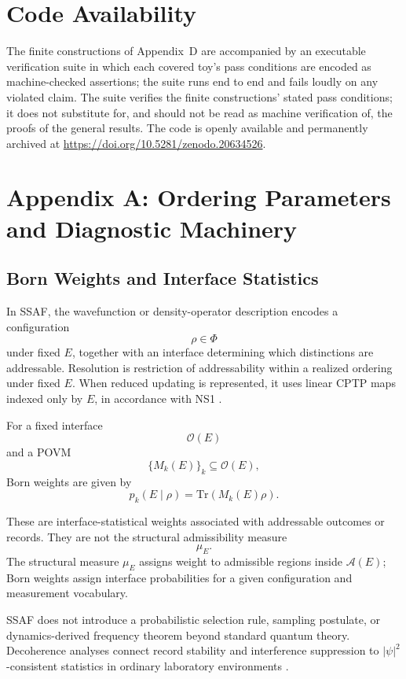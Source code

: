 \documentclass[aps,prx,onecolumn,11pt]{revtex4-2}
\theoremstyle{plain}
\theoremstyle{definition}
\theoremstyle{remark}
\begin{document}
\section*{Code Availability}

The finite constructions of Appendix~D are accompanied by an
executable verification suite in which each covered toy's pass
conditions are encoded as machine-checked assertions; the suite runs
end to end and fails loudly on any violated claim. The suite verifies
the finite constructions' stated pass conditions; it does not
substitute for, and should not be read as machine verification of, the
proofs of the general results. The code is openly
available and permanently archived at
\url{https://doi.org/10.5281/zenodo.20634526}.

\section{Appendix A: Ordering Parameters and Diagnostic Machinery}
\label{app:diagnostic_machinery}

\subsection{Born Weights and Interface Statistics}
\label{appA:admissibility_born}

In SSAF, the wavefunction or density-operator description encodes a
configuration
\[
\rho\in\Phi
\]
under fixed \(E\), together with an interface determining which
distinctions are addressable. Resolution is restriction of
addressability within a realized ordering under fixed \(E\). When
reduced updating is represented, it uses linear CPTP maps indexed only
by \(E\), in accordance with NS1
\cite{Kraus1983,Lindblad1976,Gorini1976,Watrous2018,Gisin1989,
Gisin1990,Polchinski1991}.

For a fixed interface
\[
\mathcal O(E)
\]
and a POVM
\[
\{M_k(E)\}_k\subseteq\mathcal O(E),
\]
Born weights are given by
\[
p_k(E\mid\rho)
=
\mathrm{Tr}(M_k(E)\rho).
\]

These are interface-statistical weights associated with addressable
outcomes or records. They are not the structural admissibility measure
\[
\mu_E.
\]
The structural measure \(\mu_E\) assigns weight to admissible regions
inside \(\mathcal A(E)\); Born weights assign interface probabilities
for a given configuration and measurement vocabulary.

SSAF does not introduce a probabilistic selection rule, sampling
postulate, or dynamics-derived frequency theorem beyond standard
quantum theory. Decoherence analyses connect record stability and
interference suppression to \(|\psi|^2\)-consistent statistics in
ordinary laboratory environments
\cite{Zurek2003,Zurek2005,Schlosshauer2007,Joos2003}.
\end{document}
